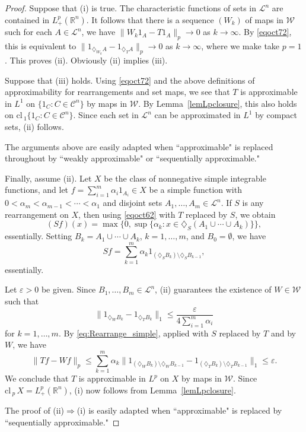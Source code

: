 \documentclass[12pt,reqno]{amsart}
\newcommand{\ee}{\varepsilon}
\newcommand{\R}{{\mathbb R}}
\newcommand{\cL}{\mathcal L}
\newcommand{\cW}{{\mathcal W}}
\newcommand{\cl}{{\mathrm{cl}}\,}
\newcommand{\di}{\diamondsuit}
\numberwithin{equation}{section}
\begin{document}
\begin{proof}
Suppose that (i) is true.  The characteristic functions of sets in ${\cL}^n$ are contained in $L^p_+(\R^n)$. It follows that there is a sequence $(W_{k})$ of maps in ${\cW}$ such for each $A\in {\cL}^n$, we have $\|W_{k} 1_A-T1_A\|_p\to 0$ as $k\to \infty$. By \eqref{eqoct72}, this is equivalent to $\|1_{\di_{W_k}A}-1_{\di_{T}A}\|_p\to 0$ as $k\to \infty$, where we make take $p=1$.  This proves (ii). Obviously (ii) implies (iii).

Suppose that (iii) holds.  Using \eqref{eqoct72} and the above definitions of approximability for rearrangements and set maps, we see that $T$ is approximable in $L^1$ on $\{1_C:C\in {\mathcal{C}}^n\}$ by maps in $\cW$. By Lemma~\ref{lemLpclosure}, this also holds on $\cl_{\!1}\{1_C:C\in \mathcal C^n\}$.  Since each set in $\cL^n$ can be approximated in $L^1$ by compact sets, (ii) follows.

The arguments above are easily adapted when ``approximable" is replaced throughout by ``weakly approximable" or ``sequentially approximable."

Finally, assume (ii).  Let $X$ be the class of nonnegative simple integrable functions, and let $f=\sum_{i=1}^m \alpha_i 1_{A_i}\in X$ be a simple function with $0<\alpha_m<\alpha_{m-1}<\cdots<\alpha_1$ and disjoint sets $A_1,\ldots,A_m\in \cL^n$.  If $S$ is any rearrangement on $X$, then using \eqref{eqoct62} with $T$ replaced by $S$, we obtain
\[
(Sf)(x)=\max\{0,\sup\{\alpha_k: x\in \di_S(A_1\cup\cdots\cup A_k)\}\},
\]
essentially. Setting $B_k=A_1\cup\cdots\cup A_k$, $k=1,\ldots,m$, and $B_0=\emptyset$, we have
\begin{equation}
\label{eq:Rearrange_simple}
Sf=\sum_{k=1}^m\alpha_k
1_{(\di_S B_k)\setminus \di_S B_{k-1}},
\end{equation}
essentially.

Let $\ee>0$ be given. Since $B_1,\ldots,B_m\in  \cL^n$, (ii) guarantees the existence of $W\in \cW$ such that
\[
\|1_{\di_W B_k}-1_{\di_T B_k}\|_1\le \frac{\ee}{4\sum_{i=1}^m\alpha_i}
\]
for $k=1,\ldots,m$. By \eqref{eq:Rearrange_simple}, applied with $S$ replaced by $T$ and by $W$, we have
\[
\|Tf-Wf\|_p\le
\sum_{k=1}^m\alpha_k \|1_{(\di_W B_k)\setminus \di_W B_{k-1}}-1_{(\di_T B_k)\setminus\di_T B_{k-1}}\|_1\le\ee.
\]
We conclude that $T$ is approximable in $L^p$ on $X$ by maps in $\cW$. Since $\cl_{\!p}\,X=L^p_+(\R^n)$, (i) now follows from Lemma~\ref{lemLpclosure}.

The proof of (ii)$\Rightarrow$(i) is easily adapted when ``approximable" is replaced by ``sequentially approximable."
\end{proof}
\end{document}
